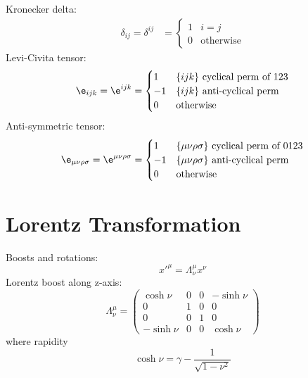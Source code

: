 \documentclass[a4paper, 11pt, normalem]{report}
\begin{document}
Kronecker delta:
\begin{align}
    \delta_{ij} = \delta^{ij} &= \begin{cases} 1 & i=j \\ 0 & \text{otherwise} \end{cases} 
\end{align}
Levi-Civita tensor:
\begin{equation}
    \e_{ijk} = \e^{ijk} = \begin{cases} 1 & \{ijk\} \text{ cyclical perm of 123} \\ -1 & \{ijk\} \text{ anti-cyclical perm} \\ 0 & \text{otherwise} \end{cases}
\end{equation}
Anti-symmetric tensor:
\begin{equation}
    \e_{\mu\nu\rho\sigma} = \e^{\mu\nu\rho\sigma} = \begin{cases} 1 & \{\mu\nu\rho\sigma\} \text{ cyclical perm of 0123} \\ -1 & \{\mu\nu\rho\sigma\} \text{ anti-cyclical perm} \\ 0 & \text{otherwise} \end{cases}
\end{equation}

\section{Lorentz Transformation}
Boosts and rotations:
\begin{equation}
    x'^\mu = \Lambda^\mu_\nu x^\nu
\end{equation}
Lorentz boost along z-axis:
\begin{equation}
    \Lambda^\mu_\nu = \begin{pmatrix} \cosh\nu & 0 & 0 & -\sinh\nu \\ 0 & 1 & 0 & 0 \\ 0 & 0 & 1 & 0 \\ -\sinh\nu & 0 & 0 & \cosh\nu \end{pmatrix}
\end{equation}
where rapidity
\begin{equation}
    \cosh\nu = \gamma - \frac{1}{\sqrt{1-\nu^2}}
\end{equation}
\end{document}
